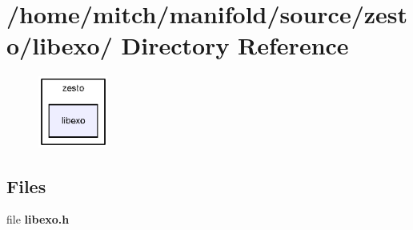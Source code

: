 \section{/home/mitch/manifold/source/zesto/libexo/ Directory Reference}
\label{dir_cfc4ad359e2b75a3e0b52e07d7aed363}


\nopagebreak
\begin{figure}[H]
\begin{center}
\leavevmode
\includegraphics[width=65pt]{dir_cfc4ad359e2b75a3e0b52e07d7aed363_dep}
\end{center}
\end{figure}
\subsection*{Files}
\begin{CompactItemize}
\item 
file {\bf libexo.h}
\end{CompactItemize}
